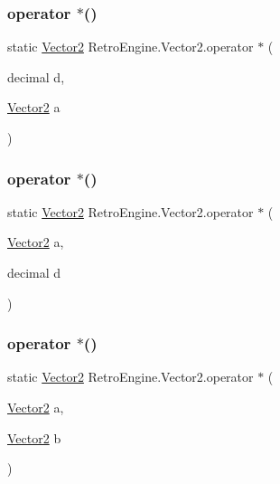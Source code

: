 \subsubsection{\texorpdfstring{operator $\ast$()}{operator *()}\hspace{0.1cm}{\footnotesize\ttfamily [3/5]}}
{\footnotesize\ttfamily static \mbox{\hyperlink{struct_retro_engine_1_1_vector2}{Vector2}} Retro\+Engine.\+Vector2.\+operator $\ast$ (\begin{DoxyParamCaption}\item[{decimal}]{d,  }\item[{\mbox{\hyperlink{struct_retro_engine_1_1_vector2}{Vector2}}}]{a }\end{DoxyParamCaption})\hspace{0.3cm}{\ttfamily [static]}}

\mbox{\label{struct_retro_engine_1_1_vector2_aa8e8f5ef517907a5debc5081a9c8ddd0}} 
\subsubsection{\texorpdfstring{operator $\ast$()}{operator *()}\hspace{0.1cm}{\footnotesize\ttfamily [4/5]}}
{\footnotesize\ttfamily static \mbox{\hyperlink{struct_retro_engine_1_1_vector2}{Vector2}} Retro\+Engine.\+Vector2.\+operator $\ast$ (\begin{DoxyParamCaption}\item[{\mbox{\hyperlink{struct_retro_engine_1_1_vector2}{Vector2}}}]{a,  }\item[{decimal}]{d }\end{DoxyParamCaption})\hspace{0.3cm}{\ttfamily [static]}}

\mbox{\label{struct_retro_engine_1_1_vector2_abfd7ed66aac350e5878d07e627e7d83e}} 
\subsubsection{\texorpdfstring{operator $\ast$()}{operator *()}\hspace{0.1cm}{\footnotesize\ttfamily [5/5]}}
{\footnotesize\ttfamily static \mbox{\hyperlink{struct_retro_engine_1_1_vector2}{Vector2}} Retro\+Engine.\+Vector2.\+operator $\ast$ (\begin{DoxyParamCaption}\item[{\mbox{\hyperlink{struct_retro_engine_1_1_vector2}{Vector2}}}]{a,  }\item[{\mbox{\hyperlink{struct_retro_engine_1_1_vector2}{Vector2}}}]{b }\end{DoxyParamCaption})\hspace{0.3cm}{\ttfamily [static]}}

